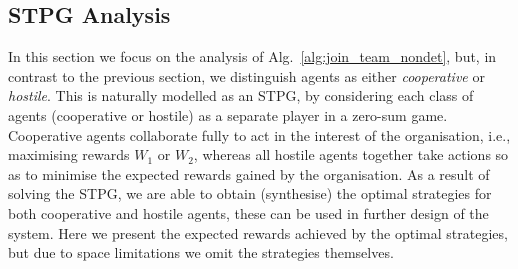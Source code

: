 \documentclass{llncs}
\begin{document}
\subsection{STPG Analysis}
\label{subsec:STPG}
In this section we focus on the analysis of Alg.~\ref{alg:join_team_nondet}, but, in contrast to the previous section,
we distinguish agents as either \emph{cooperative} or \emph{hostile}. This is naturally modelled as an STPG,
by considering each class of agents (cooperative or hostile) as a separate player in a zero-sum game. Cooperative agents collaborate fully to act in the interest of the organisation, i.e., maximising rewards $W_1$ or $W_2$, whereas all hostile agents together take actions so as to minimise the expected rewards gained by the organisation. As a result of solving the STPG, we are able to obtain (synthesise) the optimal strategies for both cooperative and hostile agents, these can be used in further design of the system. Here we present the expected rewards achieved by the optimal strategies, but due to space limitations we omit the strategies themselves.
\end{document}
